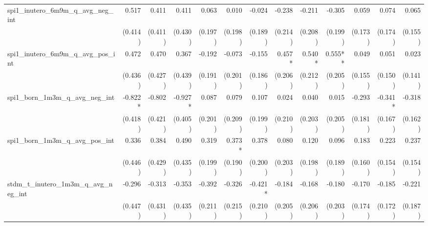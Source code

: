 \begin{tabular}{lrrrrrrrrrrrr}
spi1\_inutero\_6m9m\_q\_avg\_neg\_int       &        0.517 &        0.411 &        0.411 &        0.063 &        0.010 &       -0.024 &       -0.238 &       -0.211 &       -0.305 &        0.059 &        0.074 &        0.065 \\ 
                                            &      (0.414) &      (0.411) &      (0.430) &      (0.197) &      (0.198) &      (0.189) &      (0.214) &      (0.208) &      (0.199) &      (0.173) &      (0.174) &      (0.155) \\ 
spi1\_inutero\_6m9m\_q\_avg\_pos\_int       &        0.472 &        0.470 &        0.367 &       -0.192 &       -0.073 &       -0.155 &       0.457* &       0.540* &      0.555** &        0.049 &        0.051 &        0.023 \\ 
                                            &      (0.436) &      (0.427) &      (0.439) &      (0.191) &      (0.201) &      (0.186) &      (0.206) &      (0.212) &      (0.205) &      (0.155) &      (0.150) &      (0.141) \\ 
spi1\_born\_1m3m\_q\_avg\_neg\_int          &      -0.822* &       -0.802 &      -0.927* &        0.087 &        0.079 &        0.107 &        0.024 &        0.040 &        0.015 &       -0.293 &      -0.341* &       -0.318 \\ 
                                            &      (0.418) &      (0.421) &      (0.405) &      (0.201) &      (0.209) &      (0.199) &      (0.210) &      (0.203) &      (0.205) &      (0.181) &      (0.167) &      (0.162) \\ 
spi1\_born\_1m3m\_q\_avg\_pos\_int          &        0.336 &        0.384 &        0.490 &        0.319 &       0.373* &        0.378 &        0.080 &        0.120 &        0.096 &        0.183 &        0.223 &        0.237 \\ 
                                            &      (0.446) &      (0.429) &      (0.435) &      (0.199) &      (0.190) &      (0.200) &      (0.203) &      (0.198) &      (0.189) &      (0.160) &      (0.154) &      (0.154) \\ 
stdm\_t\_inutero\_1m3m\_q\_avg\_neg\_int    &       -0.296 &       -0.313 &       -0.353 &       -0.392 &       -0.326 &      -0.421* &       -0.184 &       -0.168 &       -0.180 &       -0.170 &       -0.185 &       -0.221 \\ 
                                            &      (0.447) &      (0.431) &      (0.435) &      (0.211) &      (0.215) &      (0.210) &      (0.205) &      (0.206) &      (0.203) &      (0.174) &      (0.172) &      (0.187) \\ 

\end{tabular}
